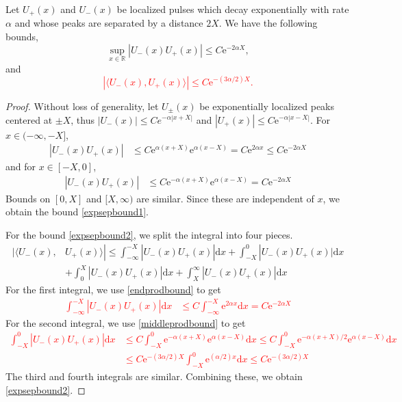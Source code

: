 \documentclass[review,onefignum,onetabnum]{siamart171218}
\newcommand{\R}{\mathbb{R}}
\newcommand{\rmd}{\mathrm{d}}
\newcommand{\rme}{\mathrm{e}}
\newcommand{\revised}[1]{ \textcolor{red}{#1} }
\begin{document}
\begin{lemma}\label{expseplemma}
Let $U_+(x)$ and $U_-(x)$ be localized pulses which decay exponentially with rate $\alpha$ and whose peaks are separated by a distance $2 X$. We have the following bounds,
\begin{equation}\label{expsepbound1}
\sup_{x \in \R} | U_-(x) U_+(x)|\leq C \rme^{-2 \alpha X},
\end{equation}
and
\revised{
\begin{equation}\label{expsepbound2}
|\langle U_-(x), U_+(x) \rangle |\leq C \rme^{-(3 \alpha/2) X}.
\end{equation}
}
\begin{proof}
Without loss of generality, let $U_\pm(x)$ be exponentially localized peaks centered at $\pm X$, thus $|U_-(x)| \leq C e^{-\alpha|x + X|}$ and $|U_+(x)| \leq C \rme^{-\alpha|x - X|}$. For $x \in (-\infty, -X]$,
\begin{align}\label{endprodbound}
| U_-(x) U_+(x) | &\leq C \rme^{\alpha(x + X)} \rme^{\alpha(x - X)} = C \rme^{2 \alpha x} \leq C \rme^{-2 \alpha X}
\end{align}
and for $x \in [-X, 0]$,
\begin{align}\label{middleprodbound}
| U_-(x) U_+(x) | &\leq C \rme^{-\alpha(x + X)} \rme^{\alpha(x - X)} = C \rme^{-2 \alpha X}
\end{align}
Bounds on $[0, X]$ and $[X, \infty)$ are similar. Since these are independent of $x$, we obtain the bound \cref{expsepbound1}.

For the bound \cref{expsepbound2}, we split the integral into four pieces.
\begin{equation}
\begin{aligned}
| \langle U_-(x), &U_+(x) \rangle |
\leq \int_{-\infty}^{-X} |U_-(x) U_+(x)| \rmd x + \int_{-X}^0 |U_-(x) U_+(x)|\rmd x \\
&+\int_0^X |U_-(x) U_+(x)| \rmd x +\int_X^\infty |U_-(x) U_+(x)| \rmd x
\end{aligned}
\end{equation}
For the first integral, we use \cref{endprodbound} to get
\revised{
\begin{align*}
\int_{-\infty}^{-X} |U_-(x) U_+(x)| \rmd x &\leq C \int_{-\infty}^{-X} \rme^{2 \alpha x} \rmd x = C \rme^{-2 \alpha X}
\end{align*}
}
For the second integral, we use \cref{middleprodbound} to get
\revised{
\begin{align*}
\int_{-X}^0 |U_-(x) U_+(x)| \rmd x &\leq C \int_{-X}^0 \rme^{-\alpha(x + X)} \rme^{\alpha(x - X)} \rmd x \leq C \int_{-X}^0 \rme^{-\alpha(x + X)/2}\rme^{\alpha(x - X)} \rmd x \\
&\leq C \rme^{-(3 \alpha/2) X } \int_{-X}^0 \rme^{(\alpha/2)x} \rmd x \leq C \rme^{-(3 \alpha/2) X }
\end{align*}
}
The third and fourth integrals are similar. Combining these, we obtain \cref{expsepbound2}.
\end{proof}
\end{lemma}
\end{document}

